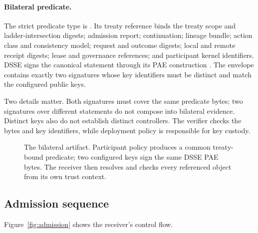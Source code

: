 \paragraph{Bilateral predicate.}
The strict predicate type is . Its treaty reference binds the treaty scope and ladder-intersection digests; admission report; continuation; lineage bundle; action class and consistency model; request and outcome digests; local and remote receipt digests; lease and governance references; and participant kernel identifiers. DSSE signs the canonical statement through its PAE construction \cite{dsse}. The envelope contains exactly two signatures whose key identifiers must be distinct and match the configured public keys.

Two details matter. Both signatures must cover the same predicate bytes; two
signatures over different statements do not compose into bilateral evidence.
Distinct keys also do not establish distinct controllers. The verifier checks
the bytes and key identifiers, while deployment policy is responsible for key
custody.

\begin{figure}[t]
  \centering
  \resizebox{.83\textwidth}{!}{}
  \caption{The bilateral artifact. Participant policy produces a common treaty-bound predicate; two configured keys sign the same DSSE PAE bytes. The receiver then resolves and checks every referenced object from its own trust context.}
  \label{fig:treaty}
\end{figure}

\subsection{Admission sequence}

Figure~\ref{fig:admission} shows the receiver's control flow.

